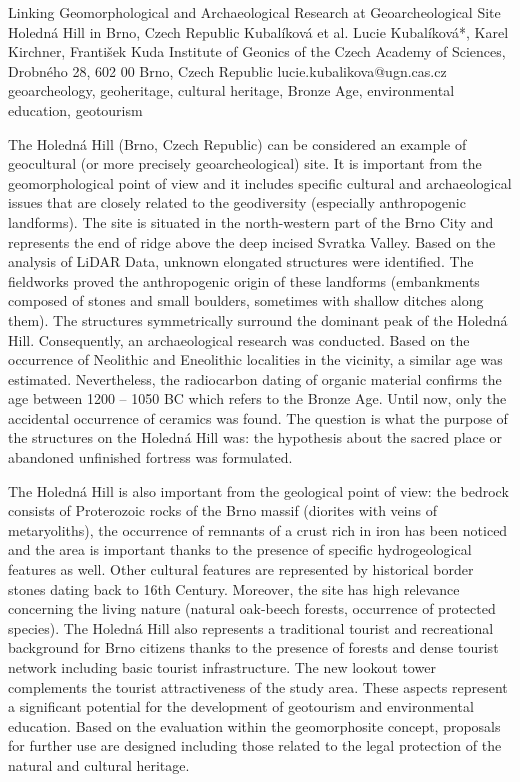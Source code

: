 \abstract
{Linking Geomorphological and Archaeological Research at Geoarcheological Site Holedná Hill in Brno, Czech Republic} 
{Kubalíková et al.} 
{Lucie Kubalíková*, Karel Kirchner, František Kuda} 
{\KLtag} 
{Institute of Geonics of the Czech Academy of Sciences, Drobného 28, 602 00 Brno, Czech Republic
}
{lucie.kubalikova@ugn.cas.cz}  %
{geoarcheology, geoheritage, cultural heritage, Bronze Age, environmental education, geotourism}
{The Holedná Hill (Brno, Czech Republic) can be considered an example of geocultural (or more precisely geoarcheological) site. It is important from the geomorphological point of view and it includes specific cultural and archaeological issues that are closely related to the geodiversity (especially anthropogenic landforms). The site is situated in the north-western part of the Brno City and represents the end of ridge above the deep incised Svratka Valley. Based on the analysis of LiDAR Data, unknown elongated structures were identified. The fieldworks proved the anthropogenic origin of these landforms (embankments composed of stones and small boulders, sometimes with shallow ditches along them). The structures symmetrically surround the dominant peak of the Holedná Hill. Consequently, an archaeological research was conducted. Based on the occurrence of Neolithic and Eneolithic localities in the vicinity, a similar age was estimated. Nevertheless, the radiocarbon dating of organic material confirms the age between 1200 -- 1050 BC which refers to the Bronze Age. Until now, only the accidental occurrence of ceramics was found. The question is what the purpose of the structures on the Holedná Hill was: the hypothesis about the sacred place or abandoned unfinished fortress was formulated.

The Holedná Hill is also important from the geological point of view: the bedrock consists of Proterozoic rocks of the Brno massif (diorites with veins of metaryoliths), the occurrence of remnants of a crust rich in iron has been noticed and the area is important thanks to the presence of specific hydrogeological features as well. Other cultural features are represented by historical border stones dating back to 16th Century. Moreover, the site has high relevance concerning the living nature (natural oak-beech forests, occurrence of protected species). The Holedná Hill also represents a traditional tourist and recreational background for Brno citizens thanks to the presence of forests and dense tourist network including basic tourist infrastructure. The new lookout tower complements the tourist attractiveness of the study area. These aspects represent a significant potential for the development of geotourism and environmental education. Based on the evaluation within the geomorphosite concept, proposals for further use are designed including those related to the legal protection of the natural and cultural heritage.
}
